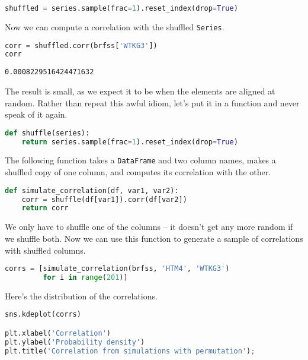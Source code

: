 \begin{lstlisting}[language=Python,style=source]
shuffled = series.sample(frac=1).reset_index(drop=True)
\end{lstlisting}

Now we can compute a correlation with the shuffled
\passthrough{\lstinline!Series!}.

\begin{lstlisting}[language=Python,style=source]
corr = shuffled.corr(brfss['WTKG3'])
corr
\end{lstlisting}

\begin{lstlisting}[style=output]
0.0008229516424471632
\end{lstlisting}

The result is small, as we expect it to be when the elements are aligned
at random. Rather than repeat this awful idiom, let's put it in a
function and never speak of it again.

\begin{lstlisting}[language=Python,style=source]
def shuffle(series):
    return series.sample(frac=1).reset_index(drop=True)
\end{lstlisting}

The following function takes a \passthrough{\lstinline!DataFrame!} and
two column names, makes a shuffled copy of one column, and computes its
correlation with the other.

\begin{lstlisting}[language=Python,style=source]
def simulate_correlation(df, var1, var2):
    corr = shuffle(df[var1]).corr(df[var2])
    return corr
\end{lstlisting}

We only have to shuffle one of the columns -- it doesn't get any more
random if we shuffle both. Now we can use this function to generate a
sample of correlations with shuffled columns.

\begin{lstlisting}[language=Python,style=source]
corrs = [simulate_correlation(brfss, 'HTM4', 'WTKG3')
         for i in range(201)]
\end{lstlisting}

Here's the distribution of the correlations.

\begin{lstlisting}[language=Python,style=source]
sns.kdeplot(corrs)

plt.xlabel('Correlation')
plt.ylabel('Probability density')
plt.title('Correlation from simulations with permutation');
\end{lstlisting}

